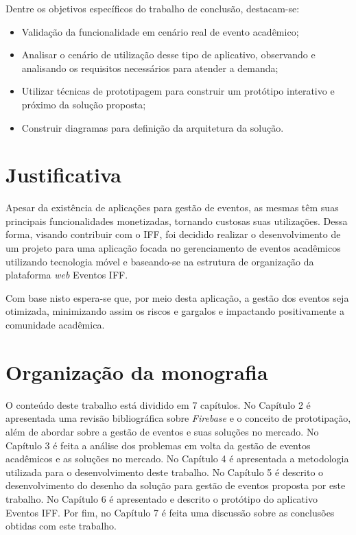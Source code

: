 Dentre os objetivos específicos do trabalho de conclusão, destacam-se:
\begin{itemize}
    \item Validação da funcionalidade em cenário real de evento acadêmico;
    \item Analisar o cenário de utilização desse tipo de aplicativo, observando e analisando os requisitos necessários para atender a demanda;
    \item Utilizar técnicas de prototipagem para construir um protótipo interativo e próximo da solução proposta;
    \item Construir diagramas para definição da arquitetura da solução. 
\end{itemize}

\section{Justificativa}

Apesar da existência de aplicações para gestão de eventos, as mesmas têm suas principais funcionalidades monetizadas, tornando custosas suas utilizações. Dessa forma, visando contribuir com o IFF, foi decidido realizar o desenvolvimento de um projeto para uma aplicação focada no gerenciamento de eventos acadêmicos utilizando tecnologia móvel e baseando-se na estrutura de organização da plataforma \textit{web} Eventos IFF.

Com base nisto espera-se que, por meio desta aplicação, a gestão dos eventos seja otimizada, minimizando assim os riscos e gargalos e impactando positivamente a comunidade acadêmica.

\section{Organização da monografia}

O conteúdo deste trabalho está dividido em 7 capítulos. No Capítulo 2 é apresentada uma revisão bibliográfica sobre \textit{Firebase} e o conceito de prototipação, além de abordar sobre a gestão de eventos e suas soluções no mercado. No Capítulo 3 é feita a análise dos problemas em volta da gestão de eventos acadêmicos e as soluções no mercado. No Capítulo 4 é apresentada a metodologia utilizada para o desenvolvimento deste trabalho. No Capítulo 5 é descrito o desenvolvimento do desenho da solução para gestão de eventos proposta por este trabalho. No Capítulo 6 é apresentado e descrito o protótipo do aplicativo Eventos IFF. Por fim, no Capítulo 7 é feita uma discussão sobre as conclusões obtidas com este trabalho.
